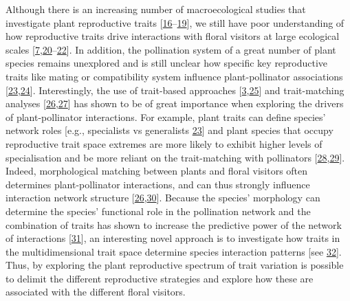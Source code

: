 \documentclass[
  12pt,
  a4paper,
]{article}
\begin{document}
Although there is an increasing number of macroecological studies that investigate plant reproductive traits {[}\protect\hyperlink{ref-baude2016}{16}--\protect\hyperlink{ref-moeller2017}{19}{]}, we still have poor understanding of how reproductive traits drive interactions with floral visitors at large ecological scales {[}\protect\hyperlink{ref-salguero2016}{7},\protect\hyperlink{ref-sargent2008}{20}--\protect\hyperlink{ref-ruger2018}{22}{]}. In addition, the pollination system of a great number of plant species remains unexplored and is still unclear how specific key reproductive traits like mating or compatibility system influence plant-pollinator associations {[}\protect\hyperlink{ref-tur2013}{23},\protect\hyperlink{ref-devaux2014}{24}{]}. Interestingly, the use of trait-based approaches {[}\protect\hyperlink{ref-fenster2004}{3},\protect\hyperlink{ref-rosas2014}{25}{]} and trait-matching analyses {[}\protect\hyperlink{ref-stang2009}{26},\protect\hyperlink{ref-bartomeus2016}{27}{]} has shown to be of great importance when exploring the drivers of plant-pollinator interactions. For example, plant traits can define species' network roles {[}e.g., specialists vs generalists \protect\hyperlink{ref-tur2013}{23}{]} and plant species that occupy reproductive trait space extremes are more likely to exhibit higher levels of specialisation and be more reliant on the trait-matching with pollinators {[}\protect\hyperlink{ref-junker2013}{28},\protect\hyperlink{ref-coux2016}{29}{]}. Indeed, morphological matching between plants and floral visitors often determines plant-pollinator interactions, and can thus strongly influence interaction network structure {[}\protect\hyperlink{ref-stang2009}{26},\protect\hyperlink{ref-ibanez2012}{30}{]}. Because the species' morphology can determine the species' functional role in the pollination network and the combination of traits has shown to increase the predictive power of the network of interactions {[}\protect\hyperlink{ref-eklof2013}{31}{]}, an interesting novel approach is to investigate how traits in the multidimensional trait space determine species interaction patterns {[}see \protect\hyperlink{ref-dehling2016}{32}{]}. Thus, by exploring the plant reproductive spectrum of trait variation is possible to delimit the different reproductive strategies and explore how these are associated with the different floral visitors.
\end{document}
